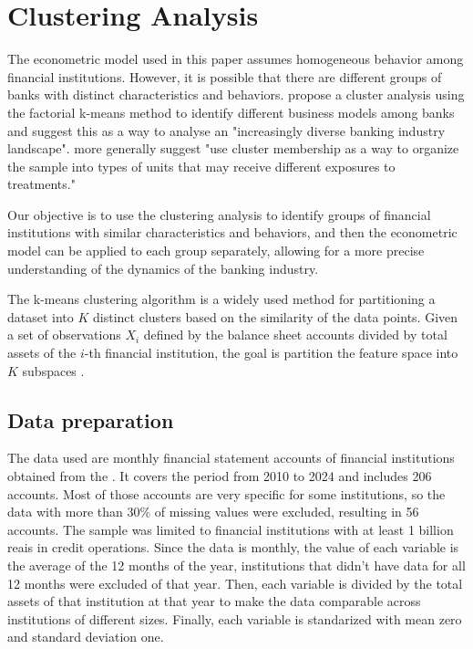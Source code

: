 \chapter{Clustering Analysis}

The econometric model used in this paper assumes homogeneous behavior among financial institutions. However, it is possible that there are different groups of banks with distinct characteristics and behaviors.  propose a cluster analysis using the factorial k-means method to identify different business models among banks and suggest this as a way to analyse an "increasingly diverse banking industry landscape".  more generally suggest "use cluster membership as a way to organize the sample into types of units that may receive different exposures to treatments."

Our objective is to use the clustering analysis to identify groups of financial institutions with similar characteristics and behaviors, and then the econometric model can be applied to each group separately, allowing for a more precise understanding of the dynamics of the banking industry.

The k-means clustering algorithm is a widely used method for partitioning a dataset into $K$ distinct clusters based on the similarity of the data points. Given a set of observations $X_i$ defined by the balance sheet accounts divided by total assets  of the $i$-th financial institution, the goal is partition the feature space into $K$ subspaces \cite{atheyMachineLearningMethods2019}. 


\section{Data preparation}

The data used are monthly financial statement accounts of financial institutions obtained from the . It covers the period from 2010 to 2024 and includes 206 accounts. Most of those accounts are very specific for some institutions, so the data with more than 30\% of missing values were excluded, resulting in 56 accounts. The sample was limited to financial institutions with at least 1 billion reais in credit operations. Since the data is monthly, the value of each variable is the average of the 12 months of the year, institutions that didn't have data for all 12 months were excluded of that year. Then, each variable is divided by the total assets of that institution at that year to make the data comparable across institutions of different sizes. Finally, each variable is standarized with mean zero and standard deviation one.

